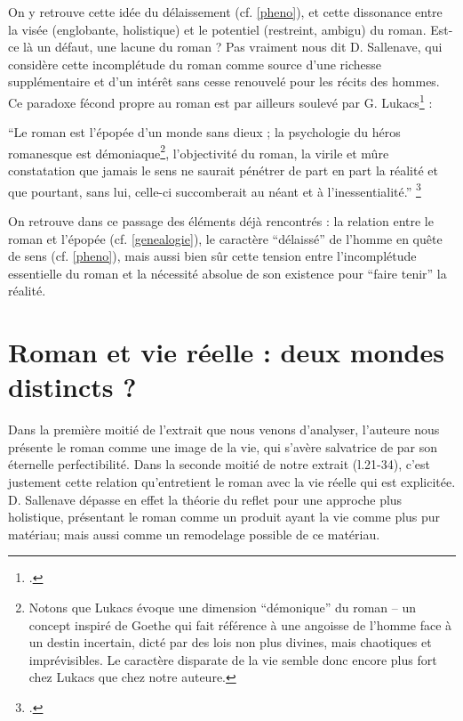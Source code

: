 \documentclass[a4paper,10pt]{article}
\begin{document}
				On y retrouve cette idée du délaissement (cf. \ref{pheno}), et cette dissonance entre la visée (englobante, holistique) et le potentiel (restreint, ambigu) du roman. Est-ce là un défaut, une lacune du roman ? Pas vraiment nous dit D. Sallenave, qui considère cette incomplétude du roman comme source d'une richesse supplémentaire et d'un intérêt sans cesse renouvelé pour les récits des hommes.\\
				Ce paradoxe fécond propre au roman est par ailleurs soulevé par G. Lukacs\footcite{Lukacs1916} :
				\begin{center}
					\footnotesize
					\begin{minipage}{0.7\textwidth}
						``Le roman est l’épopée d’un monde sans dieux ; la psychologie
						du héros romanesque est démoniaque\footnote{ Notons que Lukacs évoque une dimension ``démonique'' du roman -- un concept inspiré de Goethe qui fait référence à une angoisse de l'homme face à un destin incertain, dicté par des lois non plus divines, mais chaotiques et imprévisibles. Le caractère disparate de la vie semble donc encore plus fort chez Lukacs que chez notre auteure.}, l’objectivité du roman, la virile et mûre
						constatation que jamais le sens ne saurait pénétrer de part en part la réalité et que
						pourtant, sans lui, celle-ci succomberait au néant et à l’inessentialité.'' \footcite[p.~94]{Lukacs1916}
					\end{minipage}
				\end{center}
				On retrouve dans ce passage des éléments déjà rencontrés : la relation entre le roman et l'épopée (cf. \ref{genealogie}), le caractère ``délaissé'' de l'homme en quête de sens (cf. \ref{pheno}), mais aussi bien sûr cette tension entre l'incomplétude essentielle du roman et la nécessité absolue de son existence pour ``faire tenir'' la réalité.
	\section{Roman et vie réelle : deux mondes distincts ?}
		Dans la première moitié de l'extrait que nous venons d'analyser, l'auteure nous présente le roman comme une image de la vie, qui s'avère salvatrice de par son éternelle perfectibilité. Dans la seconde moitié de notre extrait (l.21-34), c'est justement cette relation qu'entretient le roman avec la vie réelle qui est explicitée.\\
		D. Sallenave dépasse en effet la théorie du reflet pour une approche plus holistique, présentant le roman comme un produit ayant la vie comme plus pur matériau; mais aussi comme un remodelage possible de ce matériau.
\end{document}

